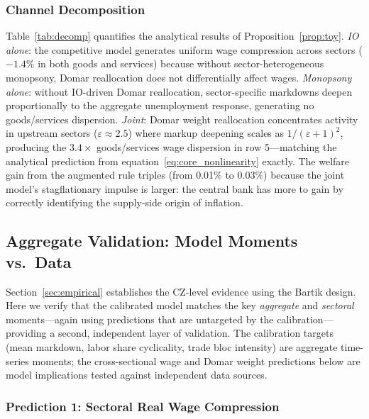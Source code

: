 \subsubsection{Channel Decomposition}
\label{sec:channel_decomp}

Table~\ref{tab:decomp} quantifies the analytical results of
Proposition~\ref{prop:toy}. \emph{IO alone}: the competitive model
generates uniform wage compression across sectors ($-1.4\%$ in both goods
and services) because without sector-heterogeneous monopsony, Domar
reallocation does not differentially affect wages. \emph{Monopsony alone}:
without IO-driven Domar reallocation, sector-specific markdowns deepen
proportionally to the aggregate unemployment response, generating no
goods/services dispersion. \emph{Joint}: Domar weight reallocation
concentrates activity in upstream sectors ($\varepsilon \approx 2.5$)
where markup deepening scales as $1/(\varepsilon+1)^2$, producing the
$3.4\times$ goods/services wage dispersion in row 5---matching the
analytical prediction from equation~\eqref{eq:core_nonlinearity}
exactly. The welfare gain from the augmented rule triples (from 0.01\%
to 0.03\%) because the joint model's stagflationary impulse is larger:
the central bank has more to gain by correctly identifying the supply-side
origin of inflation.

\subsection{Aggregate Validation: Model Moments vs.\ Data}
\label{sec:micro_moments}

Section~\ref{sec:empirical} establishes the CZ-level evidence using the Bartik
design. Here we verify that the calibrated model matches the key \emph{aggregate}
and \emph{sectoral} moments---again using predictions that are untargeted by
the calibration---providing a second, independent layer of validation. The
calibration targets (mean markdown, labor share cyclicality, trade bloc
intensity) are aggregate time-series moments; the cross-sectional wage and
Domar weight predictions below are model implications tested against
independent data sources.

\subsubsection{Prediction 1: Sectoral Real Wage Compression}


